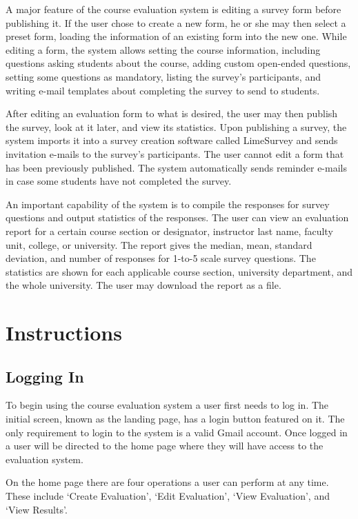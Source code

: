\documentclass{article}
\begin{document}
A major feature of the course evaluation system is editing a survey form before publishing it. If the user chose to create a new form, he or she may then select a preset form, loading the information of an existing form into the new one. While editing a form, the system allows setting the course information, including questions asking students about the course, adding custom open-ended questions, setting some questions as mandatory, listing the survey's participants, and writing e-mail templates about completing the survey to send to students.

After editing an evaluation form to what is desired, the user may then publish the survey, look at it later, and view its statistics. Upon publishing a survey, the system imports it into a survey creation software called LimeSurvey and sends invitation e-mails to the survey's participants. The user cannot edit a form that has been previously published. The system automatically sends reminder e-mails in case some students have not completed the survey.

An important capability of the system is to compile the responses for survey questions and output statistics of the responses. The user can view an evaluation report for a certain course section or designator, instructor last name, faculty unit, college, or university. The report gives the median, mean, standard deviation, and number of responses for 1-to-5 scale survey questions. The statistics are shown for each applicable course section, university department, and the whole university. The user may download the report as a file.

\section{Instructions}

\subsection{Logging In}
To begin using the course evaluation system a user first needs to log in. The initial screen, known as the landing page, has a login button featured on it. The only requirement to login to the system is a valid Gmail account. Once logged in a user will be directed to the home page where they will have access to the evaluation system. 

On the home page there are four operations a user can perform at any time. These include `Create Evaluation', `Edit Evaluation', `View Evaluation', and `View Results'.
\end{document}

